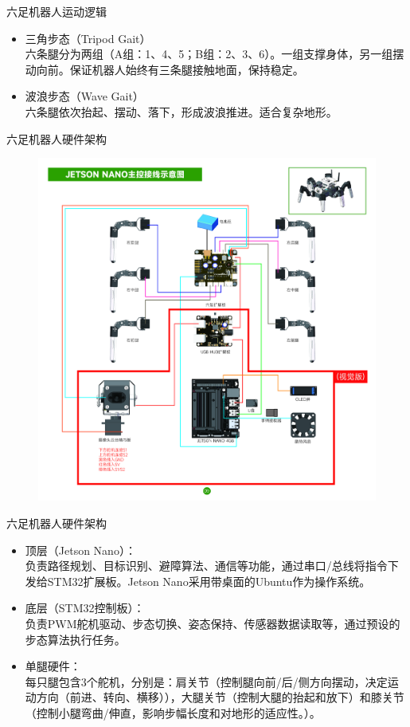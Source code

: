\documentclass{beamer}
\begin{document}
\begin{frame}{六足机器人运动逻辑}
    \begin{itemize}
        \item 三角步态（Tripod Gait）
        \\ 六条腿分为两组（A组：1、4、5；B组：2、3、6）。一组支撑身体，另一组摆动向前。保证机器人始终有三条腿接触地面，保持稳定。
        \item 波浪步态（Wave Gait）
        \\ 六条腿依次抬起、摆动、落下，形成波浪推进。适合复杂地形。
    \end{itemize}
\end{frame}

\begin{frame}{六足机器人硬件架构}
    \begin{figure}[htpb]
        \centering
        \includegraphics[width=0.6\linewidth]{pic/arch.jpg}
    \end{figure}
\end{frame}

\begin{frame}{六足机器人硬件架构}
    \begin{itemize}
        \item 顶层（Jetson Nano）：
        \\ 负责路径规划、目标识别、避障算法、通信等功能，通过串口/总线将指令下发给STM32扩展板。Jetson Nano采用带桌面的Ubuntu作为操作系统。
        \item 底层（STM32控制板）：
        \\ 负责PWM舵机驱动、步态切换、姿态保持、传感器数据读取等，通过预设的步态算法执行任务。
        \item 单腿硬件：
        \\ 每只腿包含3个舵机，分别是：肩关节（控制腿向前/后/侧方向摆动，决定运动方向（前进、转向、横移）），大腿关节（控制大腿的抬起和放下）和膝关节（控制小腿弯曲/伸直，影响步幅长度和对地形的适应性。）。
    \end{itemize}
\end{frame}
\end{document}
